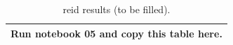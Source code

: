 \begin{table}[h]\centering\caption{reid results (to be filled).}\small\begin{tabular}{l}\toprule Run notebook 05 and copy this table here.\\\bottomrule\end{tabular}\end{table}

